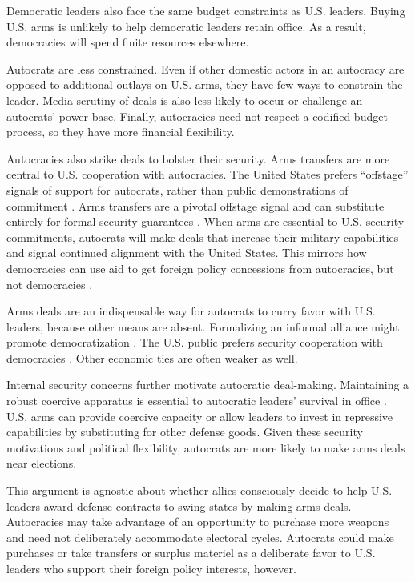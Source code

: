 \documentclass[12pt]{article}
\begin{document}
Democratic leaders also face the same budget constraints as U.S. leaders.
Buying U.S. arms is unlikely to help democratic leaders retain office. 
As a result, democracies will spend finite resources elsewhere. 


Autocrats are less constrained.
Even if other domestic actors in an autocracy are opposed to additional outlays on U.S. arms, they have few ways to constrain the leader.%
Media scrutiny of deals is also less likely to occur or challenge an autocrats' power base. 
Finally, autocracies need not respect a codified budget process, so they have more financial flexibility.  


Autocracies also strike deals to bolster their security.
Arms transfers are more central to U.S. cooperation with autocracies.  
The United States prefers ``offstage'' signals of support for autocrats, rather than public demonstrations of commitment \citep{McManusYarhi-Milo2017}.
Arms transfers are a pivotal offstage signal and can substitute entirely for formal security guarantees \citep{Yarhi-Miloetal2016}. 
When arms are essential to U.S. security commitments, autocrats will make deals that increase their military capabilities and signal continued alignment with the United States.
This mirrors how democracies can use aid to get foreign policy concessions from autocracies, but not democracies \citep{BDMSmith2009}.


Arms deals are an indispensable way for autocrats to curry favor with U.S. leaders, because other means are absent. 
Formalizing an informal alliance might promote democratization \citep{GiblerWolford2006}.
The U.S. public prefers security cooperation with democracies \citep{Alley2022}. 
Other economic ties are often weaker as well. 


Internal security concerns further motivate autocratic deal-making. 
Maintaining a robust coercive apparatus is essential to autocratic leaders' survival in office \citep{Boix2008}. 
U.S. arms can provide coercive capacity or allow leaders to invest in repressive capabilities by substituting for other defense goods. 
Given these security motivations and political flexibility, autocrats are more likely to make arms deals near elections.


This argument is agnostic about whether allies consciously decide to help U.S. leaders award defense contracts to swing states by making arms deals.
Autocracies may take advantage of an opportunity to purchase more weapons and need not deliberately accommodate electoral cycles. 
Autocrats could make purchases or take transfers or surplus materiel as a deliberate favor to U.S. leaders who support their foreign policy interests, however. 
\end{document}
